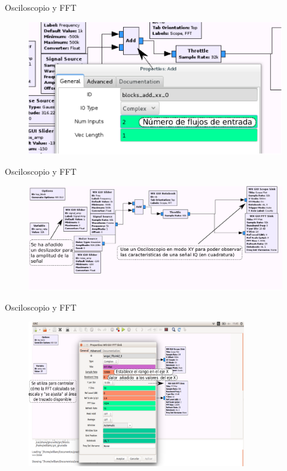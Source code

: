 \begin{frame}{Osciloscopio y FFT}
\begin{figure}[H]
\centering
\includegraphics[width=.7\textwidth]{parte1/lab2/pdf/lab2_5.pdf}
\end{figure}
\end{frame}

\begin{frame}{Osciloscopio y FFT}
\begin{figure}[H]
\vspace{-4mm}
\centering
\includegraphics[width=1.1\textwidth]{parte1/lab2/pdf/lab2_6.pdf}
\end{figure}
\end{frame}

\begin{frame}{Osciloscopio y FFT}
\begin{figure}[H]
\vspace{-4mm}
\centering
\includegraphics[width=0.85\textwidth]{parte1/lab2/pdf/lab2_7.pdf}
\end{figure}
\end{frame}


